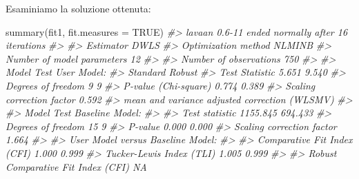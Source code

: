 \documentclass[
  11pt,
]{krantz}
\makeatletter
\newenvironment{Shaded}{\begin{snugshade}}{\end{snugshade}}
\newcommand{\AttributeTok}[1]{\textcolor[rgb]{0.61,0.61,0.61}{#1}}
\newcommand{\CommentTok}[1]{\textcolor[rgb]{0.37,0.37,0.37}{\textit{#1}}}
\newcommand{\ConstantTok}[1]{\textcolor[rgb]{0,0,0}{#1}}
\newcommand{\FunctionTok}[1]{\textcolor[rgb]{0,0,0}{#1}}
\newcommand{\NormalTok}[1]{#1}
\newenvironment{kframe}{%
\medskip{}
\setlength{\fboxsep}{.8em}
 \def\at@end@of@kframe{}%
 \ifinner\ifhmode%
  \def\at@end@of@kframe{\end{minipage}}%
  \begin{minipage}{\columnwidth}%
 \fi\fi%
 \def\FrameCommand##1{\hskip\@totalleftmargin \hskip-\fboxsep
 \colorbox{shadecolor}{##1}\hskip-\fboxsep
     \hskip-\linewidth \hskip-\@totalleftmargin \hskip\columnwidth}%
 \MakeFramed {\advance\hsize-\width
   \@totalleftmargin\z@ \linewidth\hsize
   \@setminipage}}%
 {\par\unskip\endMakeFramed%
 \at@end@of@kframe}
\renewenvironment{Shaded}{\begin{kframe}}{\end{kframe}}
\theoremstyle{definition}
\theoremstyle{definition}
\theoremstyle{definition}
\theoremstyle{definition}
\theoremstyle{remark}
\makeatother
\begin{document}
Esaminiamo la soluzione ottenuta:

\begin{Shaded}
\begin{Highlighting}[]
\FunctionTok{summary}\NormalTok{(fit1, }\AttributeTok{fit.measures =} \ConstantTok{TRUE}\NormalTok{)}
\CommentTok{\#\textgreater{} lavaan 0.6{-}11 ended normally after 16 iterations}
\CommentTok{\#\textgreater{} }
\CommentTok{\#\textgreater{}   Estimator                                       DWLS}
\CommentTok{\#\textgreater{}   Optimization method                           NLMINB}
\CommentTok{\#\textgreater{}   Number of model parameters                        12}
\CommentTok{\#\textgreater{}                                                       }
\CommentTok{\#\textgreater{}   Number of observations                           750}
\CommentTok{\#\textgreater{}                                                       }
\CommentTok{\#\textgreater{} Model Test User Model:}
\CommentTok{\#\textgreater{}                                                      Standard      Robust}
\CommentTok{\#\textgreater{}   Test Statistic                                        5.651       9.540}
\CommentTok{\#\textgreater{}   Degrees of freedom                                        9           9}
\CommentTok{\#\textgreater{}   P{-}value (Chi{-}square)                                  0.774       0.389}
\CommentTok{\#\textgreater{}   Scaling correction factor                                         0.592}
\CommentTok{\#\textgreater{}        mean and variance adjusted correction (WLSMV)                     }
\CommentTok{\#\textgreater{} }
\CommentTok{\#\textgreater{} Model Test Baseline Model:}
\CommentTok{\#\textgreater{} }
\CommentTok{\#\textgreater{}   Test statistic                              1155.845     694.433}
\CommentTok{\#\textgreater{}   Degrees of freedom                                15           9}
\CommentTok{\#\textgreater{}   P{-}value                                        0.000       0.000}
\CommentTok{\#\textgreater{}   Scaling correction factor                                  1.664}
\CommentTok{\#\textgreater{} }
\CommentTok{\#\textgreater{} User Model versus Baseline Model:}
\CommentTok{\#\textgreater{} }
\CommentTok{\#\textgreater{}   Comparative Fit Index (CFI)                    1.000       0.999}
\CommentTok{\#\textgreater{}   Tucker{-}Lewis Index (TLI)                       1.005       0.999}
\CommentTok{\#\textgreater{}                                                                   }
\CommentTok{\#\textgreater{}   Robust Comparative Fit Index (CFI)                            NA}

\end{Highlighting}
\end{Shaded}
\end{document}
